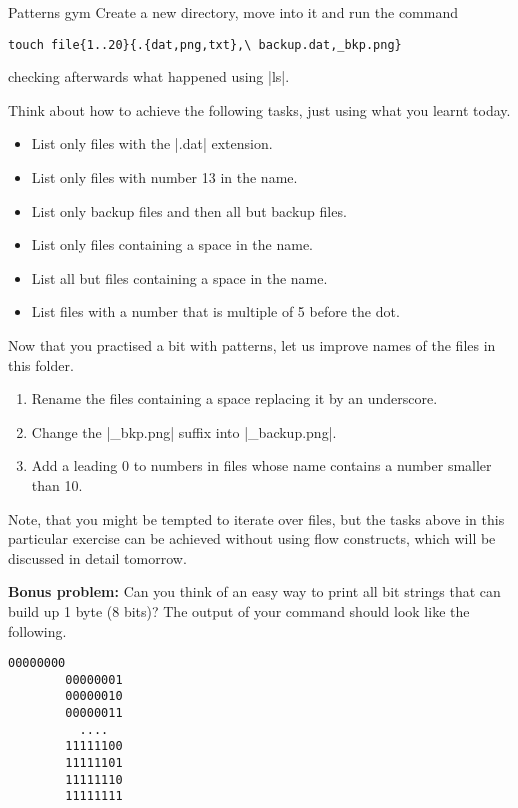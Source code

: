 
\begin{exercise}[Inspirational]{Patterns gym}
    Create a new directory, move into it and run the command
    \begin{lstlisting}[style=MyBash]
        touch file{1..20}{.{dat,png,txt},\ backup.dat,_bkp.png}
    \end{lstlisting}
    checking afterwards what happened using \bash|ls|.

    Think about how to achieve the following tasks, just using what you learnt today.
    \begin{itemize}
        \item List only files with the \bash|.dat| extension.
        \item List only files with number 13 in the name.
        \item List only backup files and then all but backup files.
        \item List only files containing a space in the name.
        \item List all but files containing a space in the name.
        \item List files with a number that is multiple of 5 before the dot.
    \end{itemize}

    Now that you practised a bit with patterns, let us improve names of the files in this folder.
    \begin{enumerate}
        \item Rename the files containing a space replacing it by an underscore.
        \item Change the \bash|_bkp.png| suffix into \bash|_backup.png|.
        \item Add a leading 0 to numbers in files whose name contains a number smaller than 10.
    \end{enumerate}
    Note, that you might be tempted to iterate over files, but the tasks above in this particular exercise can be achieved without using flow constructs, which will be discussed in detail tomorrow.

    \vspace{5mm}
    \textbf{Bonus problem:} Can you think of an easy way to print all bit strings that can build up 1 byte (8 bits)?
    The output of your command should look like the following.
    \begin{lstlisting}[style=MyBash]
        00000000
        00000001
        00000010
        00000011
          ....
        11111100
        11111101
        11111110
        11111111
    \end{lstlisting}
\end{exercise}